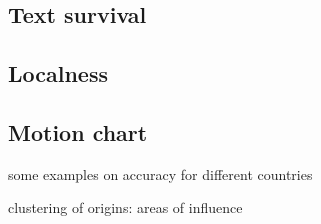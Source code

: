 \subsection{Text survival}

\subsection{Localness}

\subsection{Motion chart}

\begin{todos}
    \item some examples on accuracy for different countries
    \item clustering of origins: areas of influence
\end{todos}

